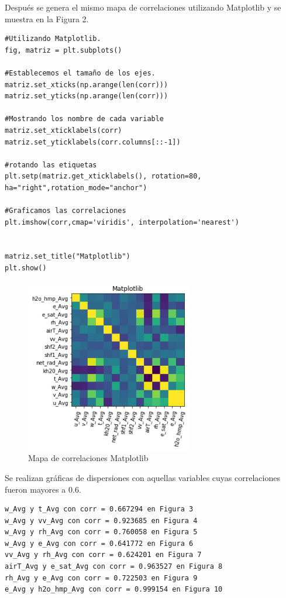 \documentclass[11pt, spanish]{report}
\begin{document}
Después se genera el mismo mapa de correlaciones utilizando Matplotlib y se muestra en la Figura 2.
\begin{verbatim}
#Utilizando Matplotlib.
fig, matriz = plt.subplots()                    

#Establecemos el tamaño de los ejes.
matriz.set_xticks(np.arange(len(corr)))      
matriz.set_yticks(np.arange(len(corr)))

#Mostrando los nombre de cada variable
matriz.set_xticklabels(corr)                 
matriz.set_yticklabels(corr.columns[::-1])

#rotando las etiquetas
plt.setp(matriz.get_xticklabels(), rotation=80, ha="right",rotation_mode="anchor")

#Graficamos las correlaciones
plt.imshow(corr,cmap='viridis', interpolation='nearest')


matriz.set_title("Matplotlib")   
plt.show()
\end{verbatim}
\begin{figure}[ht]
\caption{Mapa de correlaciones Matplotlib}
\centering
\includegraphics[width=0.65\textwidth]{matplotlib.png}
\end{figure}
Se realizan gráficas de dispersiones con aquellas variables cuyas correlaciones fueron mayores a 0.6.
\begin{verbatim}
w_Avg y t_Avg con corr = 0.667294 en Figura 3
w_Avg y vv_Avg con corr = 0.923685 en Figura 4
w_Avg y rh_Avg con corr = 0.760058 en Figura 5
w_Avg y e_Avg con corr = 0.641772 en Figura 6
vv_Avg y rh_Avg con corr = 0.624201 en Figura 7
airT_Avg y e_sat_Avg con corr = 0.963527 en Figura 8
rh_Avg y e_Avg con corr = 0.722503 en Figura 9
e_Avg y h2o_hmp_Avg con corr = 0.999154 en Figura 10
\end{verbatim}
\end{document}
